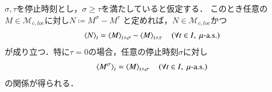	\begin{screen}
		\begin{lem}[停止時刻で停めた二次変分]
			$\sigma,\tau$を停止時刻とし，$\sigma \geq \tau$を満たしていると仮定する．
			このとき任意の$M \in \mathcal{M}_{c,loc}$に対し$N \coloneqq M^\sigma - M^\tau$
			と定めれば，$N \in \mathcal{M}_{c,loc}$かつ
			\begin{align}
				\inprod<N>_t = \inprod<M>_{t\wedge\sigma} - \inprod<M>_{t \wedge \tau}
				\quad (\forall t \in I,\ \mbox{$\mu$-a.s.})
			\end{align}
			が成り立つ．特に$\tau = 0$の場合，任意の停止時刻$\sigma$に対し
			\begin{align}
				\inprod<M^\sigma>_t = \inprod<M>_{t \wedge \sigma}
				\quad (\forall t \in I,\ \mbox{$\mu$-a.s.})
			\end{align}
			の関係が得られる．
			\label{lem:stopped_quadratic_variation}
		\end{lem}
	\end{screen}
	
